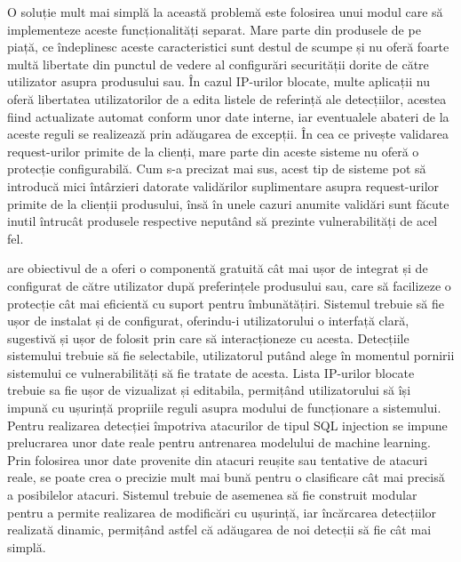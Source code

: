 O soluție mult mai simplă la această problemă este folosirea unui modul care să implementeze aceste funcționalități separat. Mare parte din produsele de pe piață, ce îndeplinesc aceste caracteristici sunt destul de scumpe și nu oferă foarte multă libertate din punctul de vedere al configurări securității dorite de către utilizator asupra produsului sau. În cazul IP-urilor blocate, multe aplicații nu oferă libertatea utilizatorilor de a edita listele de referință ale detecțiilor, acestea fiind actualizate automat conform unor date interne, iar eventualele abateri de la aceste reguli se realizează prin adăugarea de excepții. În cea ce privește validarea request-urilor primite de la clienți, mare parte din aceste sisteme nu oferă o protecție configurabilă. Cum s-a precizat mai sus, acest tip de sisteme pot să introducă mici întârzieri datorate validărilor suplimentare asupra request-urilor primite de la clienții produsului, însă în unele cazuri anumite validări sunt făcute inutil întrucât produsele respective neputând să prezinte vulnerabilități de acel fel. 

 \textit{\thesistitle}  are obiectivul de a oferi o componentă gratuită cât mai ușor de integrat și de configurat de către utilizator după preferințele produsului sau, care să facilizeze o protecție cât mai eficientă cu suport pentru îmbunătățiri. Sistemul trebuie să fie ușor de instalat și de configurat, oferindu-i utilizatorului o interfață clară, sugestivă și ușor de folosit prin care să interacționeze cu acesta. Detecțiile sistemului trebuie să fie selectabile, utilizatorul putând alege în momentul pornirii sistemului ce vulnerabilități să fie tratate de acesta. Lista IP-urilor blocate trebuie sa fie ușor de vizualizat și editabila, permițând utilizatorului să își impună cu ușurință propriile reguli asupra modului de funcționare a sistemului. Pentru realizarea detecției împotriva atacurilor de tipul SQL injection se impune prelucrarea unor date reale pentru antrenarea modelului de machine learning. Prin folosirea unor date provenite din atacuri reușite sau tentative de atacuri reale, se poate crea o precizie mult mai bună pentru o clasificare cât mai precisă a posibilelor atacuri. Sistemul trebuie de asemenea să fie construit modular pentru a permite realizarea de modificări cu ușurință, iar încărcarea detecțiilor realizată dinamic, permițând astfel că adăugarea de noi detecții să fie cât mai simplă. 




